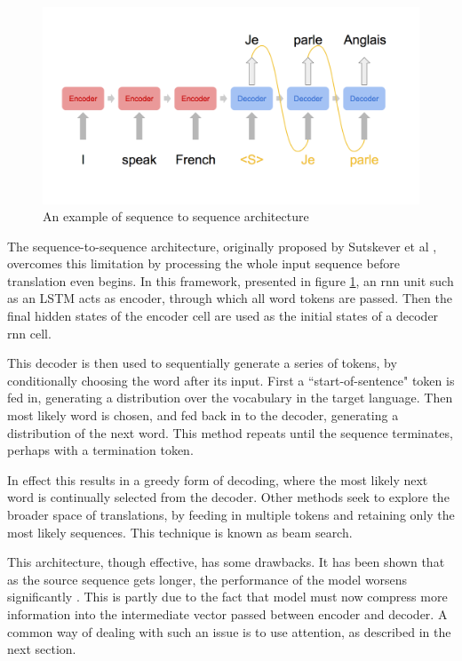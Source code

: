 \begin{figure}[tb]
    \centering
    \includegraphics[width=\linewidth]{ModelPics/seq2seq.png}
    \caption{An example of sequence to sequence architecture}
    \label{fig:seqtoseq}
\end{figure}

The sequence-to-sequence architecture, originally proposed by Sutskever et al \cite{sutskever_sequence_2014}, overcomes this limitation by processing the whole input sequence before translation even begins. 
In this framework, presented in figure \ref{fig:seqtoseq}, an rnn unit such as an LSTM acts as encoder, through which all word tokens are passed. Then the final hidden states of the encoder cell are used as the initial states of a decoder rnn cell.

This decoder is then used to sequentially generate a series of tokens, by conditionally choosing the word after its input. First a ``start-of-sentence" token is fed in, generating a distribution over the vocabulary in the target language. Then most likely word is chosen, and fed back in to the decoder, generating a distribution of the next word. This method repeats until the sequence terminates, perhaps with a termination token.

In effect this results in a greedy form of decoding, where the most likely next word is continually selected from the decoder.  Other methods seek to explore the broader space of translations, by feeding in multiple tokens and retaining only the most likely sequences. This technique is known as beam search.

This architecture, though effective, has some drawbacks. It has been shown that as the source sequence gets longer, the performance of the model worsens significantly \cite{cho_properties_2014}. This is partly due to the fact that model must now compress more information into the intermediate vector passed between encoder and decoder. A common way of dealing with such an issue is to use attention, as described in the next section. 

